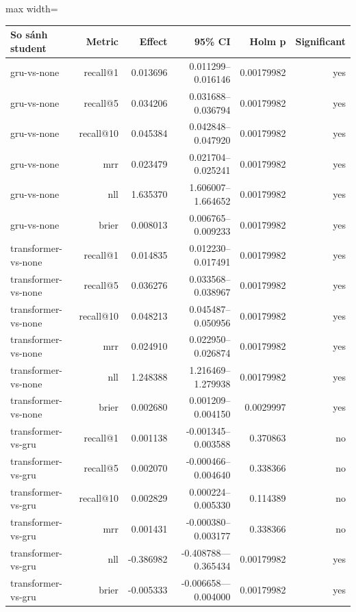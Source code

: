 \begin{table}[!htbp]
\centering
\scriptsize
\setlength{\tabcolsep}{2.5pt}
\begin{adjustbox}{max width=\textwidth}
\begin{tabular}{@{}lrrrrr@{}}
\toprule
So sánh student & Metric & Effect & 95\% CI & Holm p & Significant \\
\midrule
gru-vs-none & recall@1 & 0.013696 & 0.011299--0.016146 & 0.00179982 & yes \\
gru-vs-none & recall@5 & 0.034206 & 0.031688--0.036794 & 0.00179982 & yes \\
gru-vs-none & recall@10 & 0.045384 & 0.042848--0.047920 & 0.00179982 & yes \\
gru-vs-none & mrr & 0.023479 & 0.021704--0.025241 & 0.00179982 & yes \\
gru-vs-none & nll & 1.635370 & 1.606007--1.664652 & 0.00179982 & yes \\
gru-vs-none & brier & 0.008013 & 0.006765--0.009233 & 0.00179982 & yes \\
transformer-vs-none & recall@1 & 0.014835 & 0.012230--0.017491 & 0.00179982 & yes \\
transformer-vs-none & recall@5 & 0.036276 & 0.033568--0.038967 & 0.00179982 & yes \\
transformer-vs-none & recall@10 & 0.048213 & 0.045487--0.050956 & 0.00179982 & yes \\
transformer-vs-none & mrr & 0.024910 & 0.022950--0.026874 & 0.00179982 & yes \\
transformer-vs-none & nll & 1.248388 & 1.216469--1.279938 & 0.00179982 & yes \\
transformer-vs-none & brier & 0.002680 & 0.001209--0.004150 & 0.0029997 & yes \\
transformer-vs-gru & recall@1 & 0.001138 & -0.001345--0.003588 & 0.370863 & no \\
transformer-vs-gru & recall@5 & 0.002070 & -0.000466--0.004640 & 0.338366 & no \\
transformer-vs-gru & recall@10 & 0.002829 & 0.000224--0.005330 & 0.114389 & no \\
transformer-vs-gru & mrr & 0.001431 & -0.000380--0.003177 & 0.338366 & no \\
transformer-vs-gru & nll & -0.386982 & -0.408788---0.365434 & 0.00179982 & yes \\
transformer-vs-gru & brier & -0.005333 & -0.006658---0.004000 & 0.00179982 & yes \\
\bottomrule
\end{tabular}
\end{adjustbox}
\end{table}

